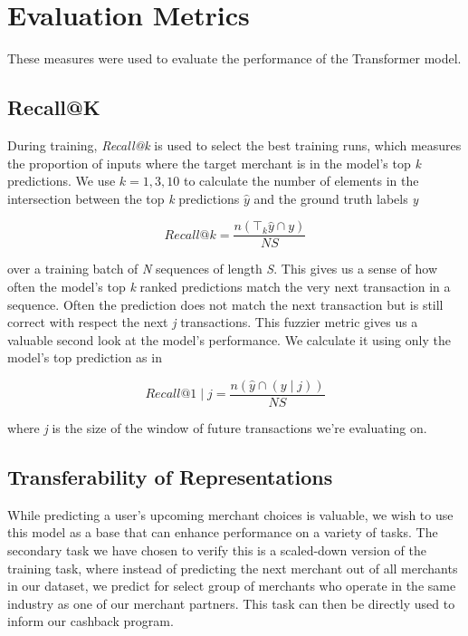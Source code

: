 \documentclass{article}
\begin{document}
\section{Evaluation Metrics}
These measures were used to evaluate the performance of the Transformer model.

\subsection{Recall@K}
During training, \textit{Recall@k} is used to select the best training runs, which measures the proportion of inputs where the target merchant is in the model’s top \textit{k} predictions. We use $k=1,3,10$ to calculate the number of elements in the intersection between the top \textit{k} predictions $\hat{y}$ and the ground truth labels \textit{y}

\begin{equation}
  Recall@k=\frac{n(\top_k\hat{y} \cap y)}{NS}
\end{equation}

over a training batch of \textit{N} sequences of length \textit{S}. This gives us a sense of how often the model's top \textit{k} ranked predictions match the very next transaction in a sequence. Often the prediction does not match the next transaction but is still correct with respect the next \textit{j} transactions. This fuzzier metric gives us a valuable second look at the model's performance. We calculate it using only the model's top prediction as in

\begin{equation}
  Recall@1 \mid j=\frac{n(\hat{y} \cap (y \mid j))}{NS}
\end{equation}

where \textit{j} is the size of the window of future transactions we're evaluating on.

\subsection{Transferability of Representations}
While predicting a user's upcoming merchant choices is valuable, we wish to use this model as a base that can enhance performance on a variety of tasks. The secondary task we have chosen to verify this is a scaled-down version of the training task, where instead of predicting the next merchant out of all merchants in our dataset, we predict for select group of merchants who operate in the same industry as one of our merchant partners. This task can then be directly used to inform our cashback program. 
\end{document}
